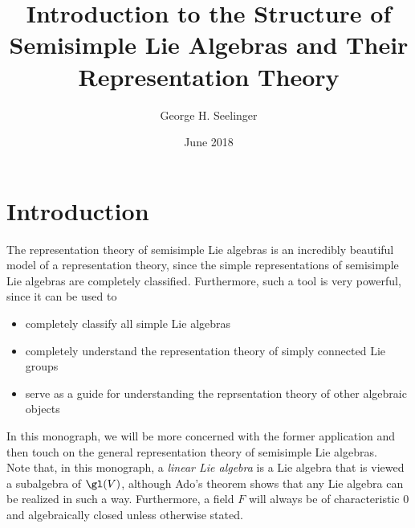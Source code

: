 \documentclass[11pt,leqno,oneside]{amsart}
\title[Introduction to the Structure of Semisimple Lie Algebras and
Their Representation Theory]{Introduction to the Structure of Semisimple Lie
Algebras and Their Representation Theory}
\author{George H. Seelinger}
\date{June 2018}
\numberwithin{thm}{section}
\begin{document}
\maketitle
\section{Introduction}
The representation theory of semisimple Lie algebras is an incredibly
beautiful model of a representation theory, since the simple
representations of semisimple Lie algebras are completely
classified. Furthermore, such a tool is very powerful, since it can be
used to
\begin{itemize}
\item completely classify all simple Lie algebras
\item completely understand the representation theory of simply
  connected Lie groups
\item serve as a guide for understanding the reprsentation theory of
  other algebraic objects
\end{itemize}
In this monograph, we will be more concerned with the former
application and then touch on the general representation theory of
semisimple Lie algebras. \\

Note that, in this monograph, a \emph{linear Lie algebra} is a Lie
algebra that is viewed a subalgebra of \(\gl(V)\), although Ado's
theorem shows that any Lie algebra can be realized in such a
way. Furthermore, a field \(F\) will always be of characteristic \(0\)
and algebraically closed unless otherwise stated.
\end{document}
